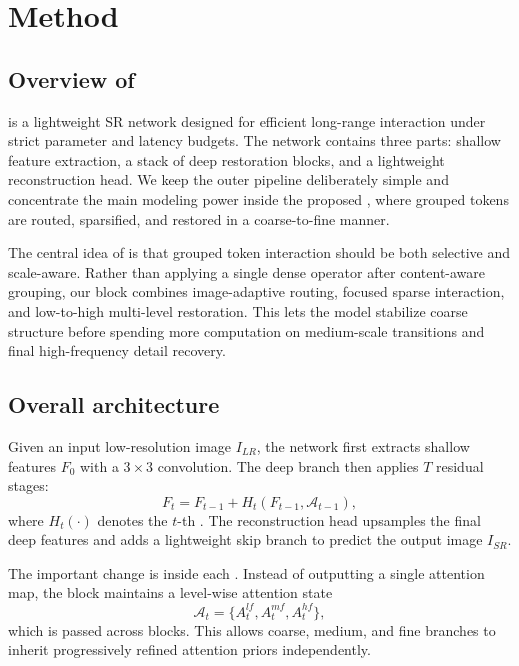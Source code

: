 \section{Method}
\label{sec:method}

\subsection{Overview of \method{}}
\method{} is a lightweight SR network designed for efficient long-range interaction under strict parameter and latency budgets. The network contains three parts: shallow feature extraction, a stack of deep restoration blocks, and a lightweight reconstruction head. We keep the outer pipeline deliberately simple and concentrate the main modeling power inside the proposed \moduleName{}, where grouped tokens are routed, sparsified, and restored in a coarse-to-fine manner.

The central idea of \method{} is that grouped token interaction should be both selective and scale-aware. Rather than applying a single dense operator after content-aware grouping, our block combines image-adaptive routing, focused sparse interaction, and low-to-high multi-level restoration. This lets the model stabilize coarse structure before spending more computation on medium-scale transitions and final high-frequency detail recovery.

\subsection{Overall architecture}
Given an input low-resolution image \(I_{LR}\), the network first extracts shallow features \(F_0\) with a \(3\times3\) convolution. The deep branch then applies \(T\) residual \moduleName{} stages:
\begin{equation}
F_t = F_{t-1} + H_t(F_{t-1}, \mathcal{A}_{t-1}),
\end{equation}
where \(H_t(\cdot)\) denotes the \(t\)-th \moduleName{}. The reconstruction head upsamples the final deep features and adds a lightweight skip branch to predict the output image \(I_{SR}\).

The important change is inside each \moduleName{}. Instead of outputting a single attention map, the block maintains a level-wise attention state
\begin{equation}
\mathcal{A}_{t} = \{A_t^{lf}, A_t^{mf}, A_t^{hf}\},
\end{equation}
which is passed across blocks. This allows coarse, medium, and fine branches to inherit progressively refined attention priors independently.


